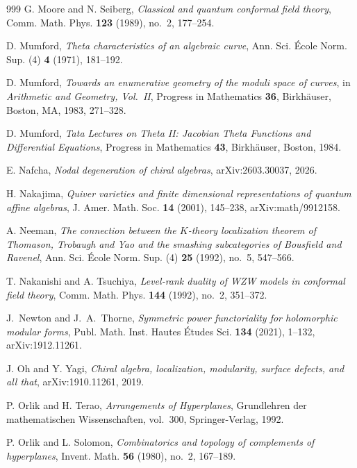 \begin{thebibliography}{999}
G. Moore and N. Seiberg, \emph{Classical and quantum conformal field theory}, Comm. Math. Phys. \textbf{123} (1989), no.~2, 177--254.

D. Mumford, \emph{Theta characteristics of an algebraic curve}, Ann. Sci. \'Ecole Norm. Sup. (4) \textbf{4} (1971), 181--192.

D. Mumford, \emph{Towards an enumerative geometry of the moduli space of curves}, in \emph{Arithmetic and Geometry, Vol.~II}, Progress in Mathematics \textbf{36}, Birkh\"auser, Boston, MA, 1983, 271--328.

D. Mumford, \emph{Tata Lectures on Theta II: Jacobian Theta Functions and Differential Equations}, Progress in Mathematics \textbf{43}, Birkh\"auser, Boston, 1984.

E. Nafcha, \emph{Nodal degeneration of chiral algebras}, arXiv:2603.30037, 2026.

H. Nakajima, \emph{Quiver varieties and finite dimensional representations of quantum affine algebras}, J. Amer. Math. Soc. \textbf{14} (2001), 145--238, arXiv:math/9912158.

A. Neeman, \emph{The connection between the $K$-theory localization theorem of Thomason, Trobaugh and Yao and the smashing subcategories of Bousfield and Ravenel}, Ann. Sci. \'Ecole Norm. Sup. (4) \textbf{25} (1992), no.~5, 547--566.

T. Nakanishi and A. Tsuchiya, \emph{Level-rank duality of WZW models in conformal field theory}, Comm. Math. Phys. \textbf{144} (1992), no.~2, 351--372.

J.~Newton and J.~A.~Thorne, \emph{Symmetric power functoriality for holomorphic modular forms}, Publ. Math. Inst. Hautes \'Etudes Sci. \textbf{134} (2021), 1--132, arXiv:1912.11261.

J. Oh and Y. Yagi, \emph{Chiral algebra, localization, modularity, surface defects, and all that}, arXiv:1910.11261, 2019.

P. Orlik and H. Terao, \emph{Arrangements of Hyperplanes}, Grundlehren der mathematischen Wissenschaften, vol.~300, Springer-Verlag, 1992.

P. Orlik and L. Solomon, \emph{Combinatorics and topology of complements of hyperplanes}, Invent. Math. \textbf{56} (1980), no.~2, 167--189.


\end{thebibliography}
